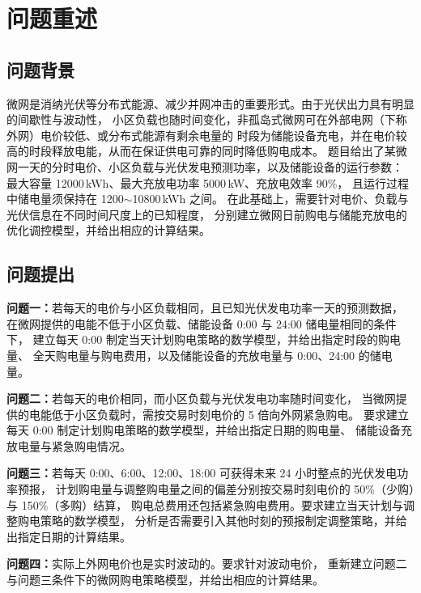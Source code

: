 \section{问题重述}

\subsection{问题背景}
微网是消纳光伏等分布式能源、减少并网冲击的重要形式。由于光伏出力具有明显的间歇性与波动性，
小区负载也随时间变化，非孤岛式微网可在外部电网（下称外网）电价较低、或分布式能源有剩余电量的
时段为储能设备充电，并在电价较高的时段释放电能，从而在保证供电可靠的同时降低购电成本。
题目给出了某微网一天的分时电价、小区负载与光伏发电预测功率，以及储能设备的运行参数：
最大容量 12000\,kWh、最大充放电功率 5000\,kW、充放电效率 90\%，
且运行过程中储电量须保持在 1200$\sim$10800\,kWh 之间。
在此基础上，需要针对电价、负载与光伏信息在不同时间尺度上的已知程度，
分别建立微网日前购电与储能充放电的优化调控模型，并给出相应的计算结果。

\subsection{问题提出}

\textbf{问题一：}若每天的电价与小区负载相同，且已知光伏发电功率一天的预测数据，
在微网提供的电能不低于小区负载、储能设备 0:00 与 24:00 储电量相同的条件下，
建立每天 0:00 制定当天计划购电策略的数学模型，并给出指定时段的购电量、
全天购电量与购电费用，以及储能设备的充放电量与 0:00、24:00 的储电量。

\textbf{问题二：}若每天的电价相同，而小区负载与光伏发电功率随时间变化，
当微网提供的电能低于小区负载时，需按交易时刻电价的 5 倍向外网紧急购电。
要求建立每天 0:00 制定计划购电策略的数学模型，并给出指定日期的购电量、
储能设备充放电量与紧急购电情况。

\textbf{问题三：}若每天 0:00、6:00、12:00、18:00 可获得未来 24 小时整点的光伏发电功率预报，
计划购电量与调整购电量之间的偏差分别按交易时刻电价的 50\%（少购）与 150\%（多购）结算，
购电总费用还包括紧急购电费用。要求建立当天计划与调整购电策略的数学模型，
分析是否需要引入其他时刻的预报制定调整策略，并给出指定日期的计算结果。

\textbf{问题四：}实际上外网电价也是实时波动的。要求针对波动电价，
重新建立问题二与问题三条件下的微网购电策略模型，并给出相应的计算结果。
